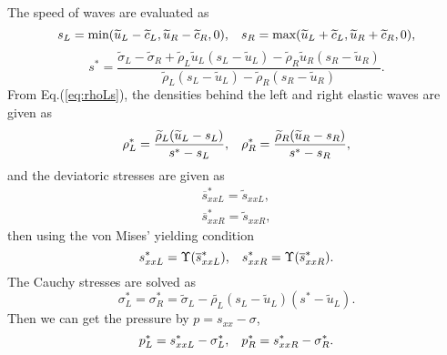 \documentclass[review]{elsarticle}
\begin{document}
The speed of waves are evaluated as
\begin{equation}\label{eq:sp3}
  s_L = \text{min} (\widetilde{u}_L-\widetilde{c}_L, \widetilde{u}_R-\widetilde{c}_R,0), \hspace{0.3cm} s_R = \text{max}(\widetilde{u}_L+\widetilde{c}_L, \widetilde{u}_R+\widetilde{c}_R,0),
    \end{equation}
    \begin{equation}
      s^* = \frac{\widetilde{\sigma}_L-\widetilde{\sigma}_R+\widetilde{\rho}_L \widetilde{u}_L(s_L-\widetilde{u}_L)-\widetilde{\rho}_R \widetilde{u}_R(s_R-\widetilde{u}_R)}{\widetilde{\rho}_L(s_L-\widetilde{u}_L)-\widetilde{\rho}_R(s_R-\widetilde{u}_R)}.
\end{equation}
From  Eq.(\ref{eq:rhoLs}), the densities behind the left and right elastic  waves are given as
\begin{equation}
  \rho_L^* = \frac{\widetilde{\rho}_L(\widetilde{u}_L-s_L)}{s^*-s_L}, \hspace{0.3cm}  \rho_R^* = \frac{\widetilde{\rho}_R(\widetilde{u}_R-s_R)}{s^*-s_R},
\end{equation}
and the deviatoric stresses are  given as
  \begin{align}
  \overline{s}_{xxL}^* =  \widetilde{s}_{xxL},\\
  \overline{s}_{xxR}^* =  \widetilde{s}_{xxR},
\end{align}
then using  the von Mises' yielding condition
\begin{equation}
  s_{xxL}^* = \Upsilon(\overline{s}_{xxL}^*) , \hspace{0.3cm}  s_{xxR}^* = \Upsilon(\overline{s}_{xxR}^*).
\end{equation}
The Cauchy stresses  are solved as
\begin{equation}
  \sigma_L^*=\sigma_R^*=\widetilde{\sigma}_L -\widetilde{\rho_L} (s_L-\widetilde{u}_L)(s^*-\widetilde{u}_L).
\end{equation}
Then  we can get the pressure by $p =s_{xx}-\sigma$,
\begin{equation}
  p_L^* = s_{xxL}^* - \sigma_L^*, \hspace{0.3cm}   p_R^* = s_{xxR}^* - \sigma_R^*.
\end{equation}

%
\end{document}
